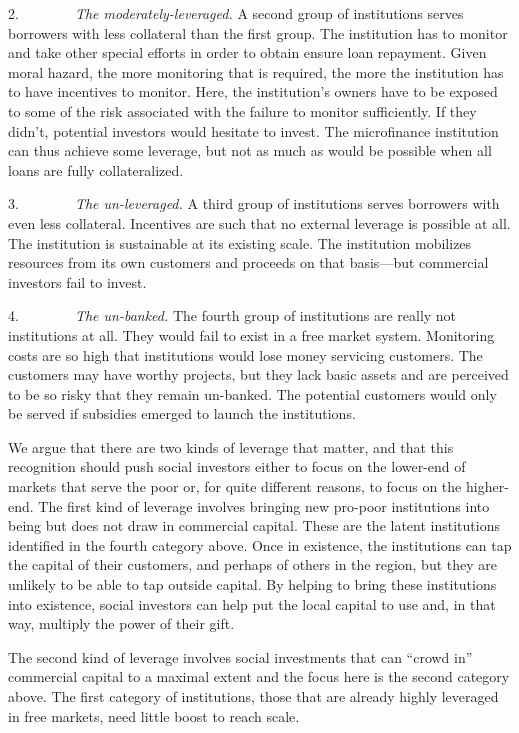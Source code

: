 \documentclass{article} %
\begin{document}
2.$\mathrm{\qquad }$$\mathrm{\qquad }$\textit{The moderately-leveraged.} A second group of institutions serves borrowers with less collateral than the first group. The institution has to monitor and take other special efforts in order to obtain ensure loan repayment. Given moral hazard, the more monitoring that is required, the more the institution has to have incentives to monitor. Here, the institution's owners have to be exposed to some of the risk associated with the failure to monitor sufficiently. If they didn't, potential investors would hesitate to invest. The microfinance institution can thus achieve some leverage, but not as much as would be possible when all loans are fully collateralized. 

3.$\mathrm{\qquad }$$\mathrm{\qquad }$\textit{The un-leveraged.} A third group of institutions serves borrowers with even less collateral. Incentives are such that no external leverage is possible at all. The institution is sustainable at its existing scale. The institution mobilizes resources from its own customers and proceeds on that basis---but commercial investors fail to invest. 

4.$\mathrm{\qquad }$$\mathrm{\qquad }$\textit{The un-banked.} The fourth group of institutions are really not institutions at all. They would fail to exist in a free market system. Monitoring costs are so high that institutions would lose money servicing customers. The customers may have worthy projects, but they lack basic assets and are perceived to be so risky that they remain un-banked. The potential customers would only be served if subsidies emerged to launch the institutions. 

We argue that there are two kinds of leverage that matter, and that this recognition should push social investors either to focus on the lower-end of markets that serve the poor or, for quite different reasons, to focus on the higher-end. The first kind of leverage involves bringing new pro-poor institutions into being but does not draw in commercial capital. These are the latent institutions identified in the fourth category above. Once in existence, the institutions can tap the capital of their customers, and perhaps of others in the region, but they are unlikely to be able to tap outside capital. By helping to bring these institutions into existence, social investors can help put the local capital to use and, in that way, multiply the power of their gift. 

The second kind of leverage involves social investments that can ``crowd in'' commercial capital to a maximal extent and the focus here is the second category above. The first category of institutions, those that are already highly leveraged in free markets, need little boost to reach scale. 
\end{document}
